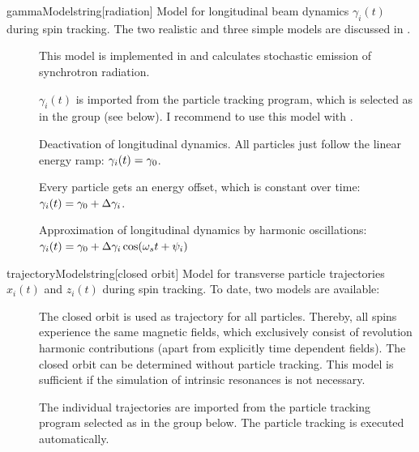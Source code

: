 \documentclass[a4paper]{scrartcl}
\begin{document}
\begin{configdoc}{gammaModel}{string}{}[radiation]
  Model for longitudinal beam dynamics $\gamma_i(t)$ during spin tracking. The two
  realistic and three simple models are discussed in \cite[chapter~4]{dr}.
  \begin{description}
  \item[] This model is implemented in \polem and calculates
    stochastic emission of synchrotron radiation.
  \item[] $\gamma_i(t)$ is imported from the particle tracking program,
    which is selected as  in the group  (see below).
    I recommend to use this model with \ele.
  \item[] Deactivation of longitudinal dynamics. All particles just
    follow the linear energy ramp: $\gamma_i(t) = \gamma_0$.
  \item[] Every particle gets an energy offset, which is constant over
    time: $\gamma_i(t) = \gamma_0 + \Delta\gamma_i$.
  \item[] Approximation of longitudinal dynamics by harmonic
    oscillations:\\$\gamma_i(t) = \gamma_0 + \Delta\gamma_i \cos(\omega_s t + \psi_i)$
  \end{description}
\end{configdoc}

\begin{configdoc}{trajectoryModel}{string}{}[closed orbit]
  Model for transverse particle trajectories $x_i(t)$ and
  $z_i(t)$ during spin tracking. To date, two models are available:
  \begin{description}
  \item[] The closed orbit is used as trajectory for all
    particles. Thereby, all spins experience the same magnetic fields, which exclusively
    consist of revolution harmonic contributions (apart from explicitly time dependent
    fields). The closed orbit can be determined without particle tracking. This model is
    sufficient if the simulation of intrinsic resonances is not necessary.
  \item[] The individual trajectories are imported from the particle
    tracking program selected as  in the group
     below. The particle tracking is executed automatically.
  \end{description}
\end{configdoc}
\end{document}
